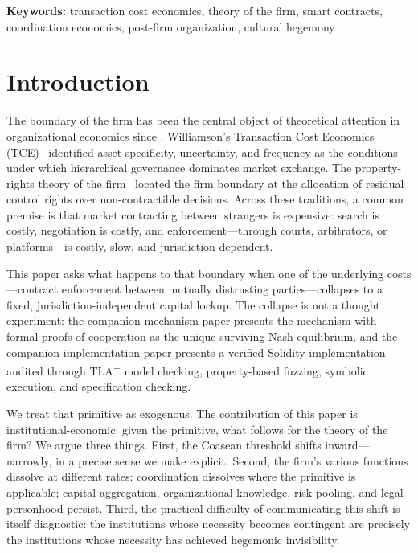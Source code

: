 \documentclass[11pt,a4paper]{article}
\theoremstyle{definition}
\theoremstyle{remark}
\begin{document}
\medskip
\noindent\textbf{Keywords:}
transaction cost economics, theory of the firm, smart contracts,
coordination economics, post-firm organization, cultural hegemony

\section{Introduction}
\label{sec:intro}

The boundary of the firm has been the central object of theoretical
attention in organizational economics since
\citet{coase1937}. Williamson's Transaction Cost Economics
(TCE)~\citep{williamson1985} identified asset specificity, uncertainty,
and frequency as the conditions under which hierarchical governance
dominates market exchange. The property-rights theory of the
firm~\citep{hart1995} located the firm boundary at the allocation of
residual control rights over non-contractible decisions. Across these
traditions, a common premise is that market contracting between
strangers is expensive: search is costly, negotiation is costly, and
enforcement---through courts, arbitrators, or platforms---is costly,
slow, and jurisdiction-dependent.

This paper asks what happens to that boundary when one of the
underlying costs---contract enforcement between mutually distrusting
parties---collapses to a fixed, jurisdiction-independent capital
lockup. The collapse is not a thought experiment: the companion
mechanism paper presents the mechanism with
formal proofs of cooperation as the unique surviving Nash
equilibrium, and the companion implementation paper
presents a verified Solidity implementation audited through
TLA\textsuperscript{+} model checking, property-based fuzzing,
symbolic execution, and specification checking.

We treat that primitive as exogenous. The contribution of this paper
is institutional-economic: given the primitive, what follows for the
theory of the firm? We argue three things. First, the Coasean
threshold shifts inward---narrowly, in a precise sense we make
explicit. Second, the firm's various functions dissolve at different
rates: coordination dissolves where the primitive is applicable;
capital aggregation, organizational knowledge, risk pooling, and legal
personhood persist. Third, the practical difficulty of communicating
this shift is itself diagnostic: the institutions whose necessity
becomes contingent are precisely the institutions whose necessity has
achieved hegemonic invisibility.
\end{document}
